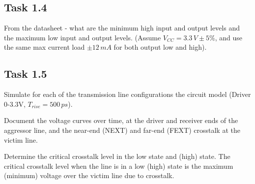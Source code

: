 \documentclass[../main.tex]{subfiles}
\begin{document}
\newpage

\subsection{Task 1.4}

From the datasheet - what are the minimum high input and output levels and the maximum low input and output levels. (Assume $V_{CC} = 3.3\,\si{V} \pm 5\%$, and use the same max current load $\pm 12 \,\si{mA}$ for both output low and high).

\solution

\subsection{Task 1.5}

Simulate for each of the transmission line configurations the circuit model (Driver 0-3.3V, $T_{rise} = 500\,\si{ps}$).

\vspace{10pt}
Document the voltage curves over time, at the driver and receiver ends of the aggressor line, and the near-end (NEXT) and far-end (FEXT) crosstalk at the victim line.

\vspace{10pt}
Determine the critical crosstalk level in the low state and (high) state. The critical crosstalk level when the line is in a low (high) state is the maximum (minimum) voltage over the victim line due to crosstalk.

\solution
\end{document}
